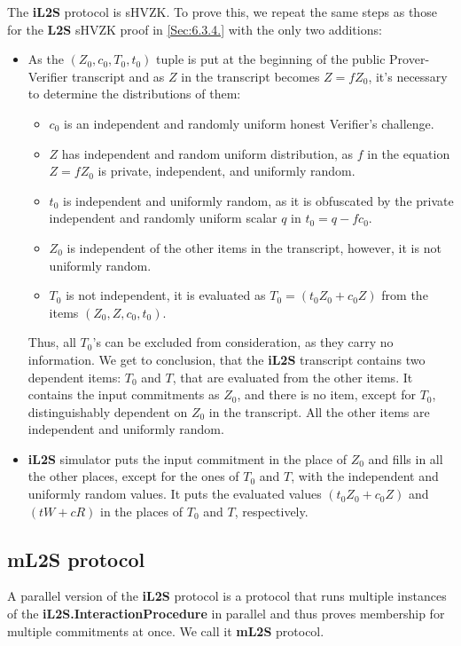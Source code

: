 \documentclass{mathcryptology} %
\theoremstyle{title}
\theoremstyle{titleof}
\begin{document}
    The \textbf{iL2S} protocol is sHVZK. To prove this, we repeat the same steps as those for the \textbf{L2S} sHVZK proof in \ref{Sec:6.3.4.} with the only two additions:
    \begin{itemize}
        \item As the $\left(Z_{0}, c_{0}, T_{0}, {t}_{0}\right)$ tuple is put at the beginning of the public Prover-Verifier transcript and as $Z$ in the transcript becomes $Z=fZ_{0}$, it's necessary to determine the distributions of them:
        \begin{itemize}
            \item $c_{0}$ is an independent and randomly uniform honest Verifier's challenge.
            \item $Z$ has independent and random uniform distribution, as $f$ in the equation $Z=fZ_{0}$ is private, independent, and uniformly random.
            \item $t_{0}$ is independent and uniformly random, as it is obfuscated by the private independent and randomly uniform scalar $q$ in $t_{0}=q-fc_{0}$.
            \item $Z_{0}$ is independent of the other items in the transcript, however, it is not uniformly random.
            \item $T_{0}$ is not independent, it is evaluated as $T_{0} = \left(t_{0} Z_{0} +c_{0} Z\right)$ from the items $\left(Z_{0},Z,c_{0},t_{0}\right)$.
        \end{itemize}
        Thus, all $T_{0}$'s can be excluded from consideration, as they carry no information. We get to conclusion, that the \textbf{iL2S} transcript contains two dependent items: $T_{0}$ and $T$, that are evaluated from the other items. It contains the input commitments as $Z_{0}$, and there is no item, except for $T_{0}$, distinguishably dependent on $Z_{0}$ in the transcript. All the other items are independent and uniformly random.
        \item \textbf{iL2S} simulator puts the input commitment in the place of $Z_{0}$ and fills in all the other places, except for the ones of $T_{0}$ and $T$, with the independent and uniformly random values. It puts the evaluated values $\left(t_{0} Z_{0} + c_{0}Z\right)$ and $\left(tW+cR\right)$ in the places of $T_{0}$ and $T$, respectively.
    \end{itemize}


\subsection{mL2S protocol}\label{Sec:7.2.}
    A parallel version of the \textbf{iL2S} protocol is a protocol that runs multiple instances of the \textbf{iL2S.InteractionProcedure} in parallel and thus proves membership for multiple commitments at once. We call it \textbf{mL2S} protocol.
\end{document}
